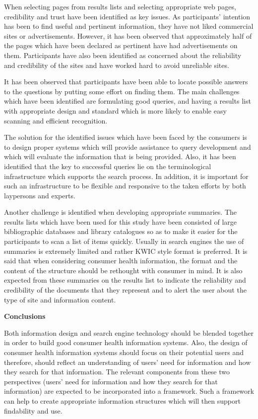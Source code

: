 \documentclass[]{article}
\begin{document}
When selecting pages from results lists and selecting appropriate web pages, credibility and trust have been identified as key issues. As participants’ intention has been to find useful and pertinent information, they have not liked commercial sites or advertisements. However, it has been observed that approximately half of the pages which have been declared as pertinent have had advertisements on them. Participants have also been identified as concerned about the reliability and credibility of the sites and have worked hard to avoid unreliable sites. 

It has been observed that participants have been able to locate possible answers to the questions by putting some effort on finding them. The main challenges which have been identified are formulating good queries, and having a results list with appropriate design and standard which is more likely to enable easy scanning and efficient recognition.  

The solution for the identified issues which have been faced by the consumers is to design proper systems which will provide assistance to query development and which will evaluate the information that is being provided. Also, it has been identified that the key to successful queries lie on the terminological infrastructure which supports the search process. In addition, it is important for such an infrastructure to be flexible and responsive to the taken efforts by both laypersons and experts. 

Another challenge is identified when developing appropriate summaries. The results lists which have been used for this study have been consisted of large bibliographic databases and library catalogues so as to make it easier for the participants to scan a list of items quickly. Usually in search engines the use of summaries is extremely limited and rather KWIC style format is preferred. It is said that when considering consumer health information, the format and the content of the structure should be rethought with consumer in mind. It is also expected from these summaries on the results list to indicate the reliability and credibility of the documents that they represent and to alert the user about the type of site and information content.           

\textbf{Conclusions}

Both information design and search engine technology should be blended together in order to build good consumer health information systems. Also, the design of consumer health information systems should focus on their potential users and therefore, should reflect an understanding of users’ need for information and how they search for that information. The relevant components from these two perspectives (users’ need for information and how they search for that information) are expected to be incorporated into a framework. Such a framework can help to create appropriate information structures which will then support findability and use.
\end{document}
